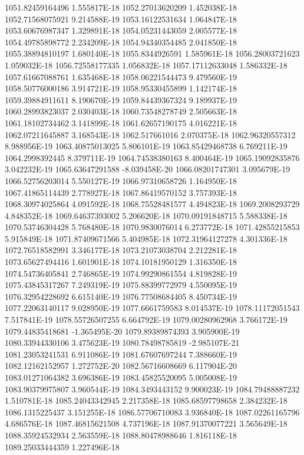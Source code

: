 1051.82459164496  1.555817E-18
1052.27013620209  1.452038E-18
1052.71568075921  9.214588E-19
1053.16122531634  1.064847E-18
1053.60676987347  1.329891E-18
1054.05231443059  2.005577E-18
1054.49785898772  2.234209E-18
1054.94340354485  2.041850E-18
1055.38894810197  1.680140E-18
1055.8344926591  1.585961E-18
1056.28003721623  1.059032E-18
1056.72558177335  1.056832E-18
1057.17112633048  1.586332E-18
1057.61667088761  1.635468E-18
1058.06221544473  9.479560E-19
1058.50776000186  3.914721E-19
1058.95330455899  1.142174E-18
1059.39884911611  8.190670E-19
1059.84439367324  9.189937E-19
1060.28993823037  2.030403E-18
1060.73548278749  2.505663E-18
1061.18102734462  3.141899E-18
1061.62657190175  4.016221E-18
1062.07211645887  3.168543E-18
1062.517661016  2.070375E-18
1062.96320557312  8.988956E-19
1063.40875013025  5.806101E-19
1063.85429468738  6.769211E-19
1064.2998392445  8.379711E-19
1064.74538380163  8.400464E-19
1065.19092835876  3.042232E-19
1065.63647291588  -8.039458E-20
1066.08201747301  3.095679E-19
1066.52756203014  5.550127E-19
1066.97310658726  1.164950E-18
1067.41865114439  2.778927E-18
1067.86419570152  3.757393E-18
1068.30974025864  4.091592E-18
1068.75528481577  4.494823E-18
1069.2008293729  4.848352E-18
1069.64637393002  5.206620E-18
1070.09191848715  5.588338E-18
1070.53746304428  5.768480E-18
1070.9830076014  6.273772E-18
1071.42855215853  5.915849E-18
1071.87409671566  5.404985E-18
1072.31964127278  4.301336E-18
1072.76518582991  3.346177E-18
1073.21073038704  2.212281E-18
1073.65627494416  1.601901E-18
1074.10181950129  1.316350E-18
1074.54736405841  2.746865E-19
1074.99290861554  4.819828E-19
1075.43845317267  7.249319E-19
1075.88399772979  4.550095E-19
1076.32954228692  6.615140E-19
1076.77508684405  8.450734E-19
1077.22063140117  9.028950E-19
1077.6661759583  8.014537E-19
1078.11172051543  7.517841E-19
1078.55726507255  6.664792E-19
1079.00280962968  3.766172E-19
1079.44835418681  -1.365495E-20
1079.89389874393  3.905900E-19
1080.33944330106  3.475623E-19
1080.78498785819  -2.985107E-21
1081.23053241531  6.911086E-19
1081.67607697244  7.388660E-19
1082.12162152957  1.272752E-20
1082.56716608669  6.117904E-20
1083.01271064382  3.696386E-19
1083.45825520095  5.005008E-19
1083.90379975807  3.960544E-19
1084.3493443152  9.900023E-19
1084.79488887232  1.510781E-18
1085.24043342945  2.217358E-18
1085.68597798658  2.384232E-18
1086.1315225437  3.151255E-18
1086.57706710083  3.936840E-18
1087.02261165796  4.686576E-18
1087.46815621508  4.737196E-18
1087.91370077221  3.565649E-18
1088.35924532934  2.563559E-18
1088.80478988646  1.816118E-18
1089.25033444359  1.227496E-18
